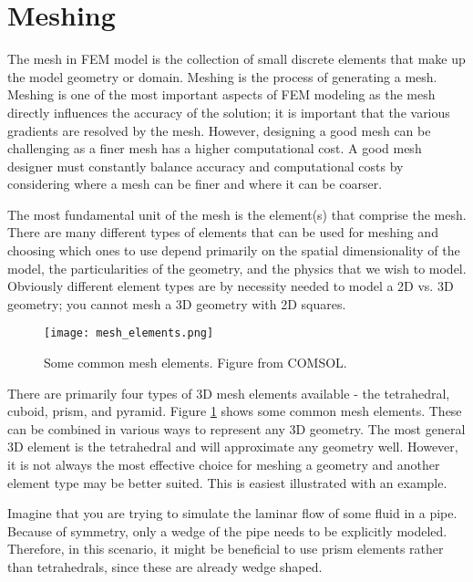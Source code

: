 \section{Meshing}\label{sec:meshing}

The mesh in FEM model is the collection of small discrete elements that make up the model geometry or domain.
Meshing is the process of generating a mesh.
Meshing is one of the most important aspects of FEM modeling as the mesh directly influences the accuracy of the solution; it is important that the various gradients are resolved by the mesh.
However, designing a good mesh can be challenging as a finer mesh has a higher computational cost.
A good mesh designer must constantly balance accuracy and computational costs by considering where a mesh can be finer and where it can be coarser.\par

The most fundamental unit of the mesh is the element(s) that comprise the mesh.
There are many different types of elements that can be used for meshing and choosing which ones to use depend primarily on the spatial dimensionality of the model, the particularities of the geometry, and the physics that we wish to model.
Obviously different element types are by necessity needed to model a 2D vs. 3D geometry; you cannot mesh a 3D geometry with 2D squares.\par

\begin{figure}[htb!]
  \centering
  \texttt{[image: mesh\_elements.png]}
  \caption{Some common mesh elements. Figure from COMSOL\cite{noauthor_detailed_nodate}.}
  \label{fig:mesh_elements}
\end{figure}

There are primarily four types of 3D mesh elements available - the tetrahedral, cuboid, prism, and pyramid.
Figure \ref{fig:mesh_elements} shows some common mesh elements.
These can be combined in various ways to represent any 3D geometry.
The most general 3D element is the tetrahedral and will approximate any geometry well.
However, it is not always the most effective choice for meshing a geometry and another element type may be better suited.
This is easiest illustrated with an example.\par

Imagine that you are trying to simulate the laminar flow of some fluid in a pipe.
Because of symmetry, only a wedge of the pipe needs to be explicitly modeled.
Therefore, in this scenario, it might be beneficial to use prism elements rather than tetrahedrals, since these are already wedge shaped.

